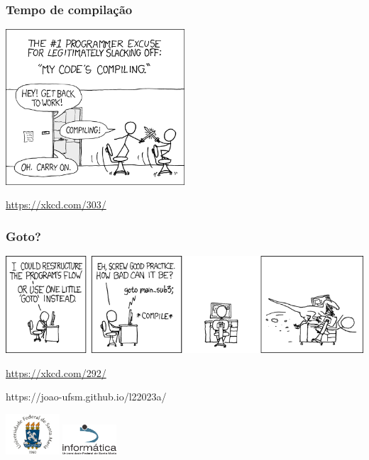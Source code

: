 \documentclass[xcolor={usenames,dvipsnames},10pt,presentation,aspectratio=169]{beamer}
\begin{document}
\begin{frame}
  \frametitle{Tempo de compilação}
  \begin{center}
	\includegraphics[width=0.5\textwidth]{compiling.png}
  \end{center}
  {\footnotesize \url{https://xkcd.com/303/}}
\end{frame}
\begin{frame}
  \frametitle{Goto?}
  \begin{center}
	\includegraphics[width=\textwidth]{goto.png}
  \end{center}
  {\footnotesize \url{https://xkcd.com/292/}}
\end{frame}
\begin{frame}[plain]{}
  \begin{center}
    \vspace{2cm}
    \Large{https://joao-ufsm.github.io/l22023a/}
    
    \vspace{1cm}
    \includegraphics[width=2cm]{logo_ufsm}
    \hspace{0.5cm}
    \includegraphics[width=2cm]{logo_inf}
  \end{center}
\end{frame}
\end{document}
